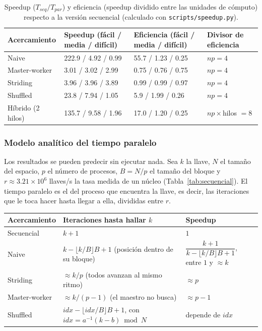 \documentclass[11pt,letterpaper]{article}
\begin{document}
\begin{table}[H]
\centering
\small
\begin{tabular}{p{2.6cm}p{3.6cm}p{3.6cm}p{3.5cm}}
\toprule
\textbf{Acercamiento} & \textbf{Speedup (fácil / media / difícil)} & \textbf{Eficiencia (fácil / media / difícil)} & \textbf{Divisor de eficiencia} \\
\midrule
Naive           & 222.9 / 4.92 / 0.99 & 55.7 / 1.23 / 0.25 & $np=4$ \\
Master-worker   & 3.01 / 3.02 / 2.99  & 0.75 / 0.76 / 0.75 & $np=4$ \\
Striding        & 3.96 / 3.96 / 3.89  & 0.99 / 0.99 / 0.97 & $np=4$ \\
Shuffled        & 23.8 / 7.94 / 1.05  & 5.9 / 1.99 / 0.26  & $np=4$ \\
Híbrido (2 hilos) & 135.7 / 9.58 / 1.96 & 17.0 / 1.20 / 0.25 & $np\times$hilos $=8$ \\
\bottomrule
\end{tabular}
\caption{Speedup ($T_{seq}/T_{par}$) y eficiencia (speedup dividido
entre las unidades de cómputo) respecto a la versión secuencial
(calculado con \texttt{scripts/speedup.py}).}
\label{tab:speedup}
\end{table}

\subsubsection*{Modelo analítico del tiempo paralelo}
\label{sec:modelo}

Los resultados se pueden predecir sin ejecutar nada. Sea $k$ la llave,
$N$ el tamaño del espacio, $p$ el número de procesos, $B=N/p$ el tamaño
del bloque y $r\approx3.21\times10^{6}$ llaves/s la tasa medida de un
núcleo (Tabla~\ref{tab:secuencial}). El tiempo paralelo es el del
proceso que encuentra la llave, es decir, las iteraciones que le toca
hacer hasta llegar a ella, divididas entre $r$.

\begin{center}
\small
\begin{tabular}{lll}
\toprule
\textbf{Acercamiento} & \textbf{Iteraciones hasta hallar $k$} & \textbf{Speedup} \\
\midrule
Secuencial & $k+1$ & $1$ \\
Naive & $k-\lfloor k/B\rfloor B+1$ (posición dentro de su bloque) & $\dfrac{k+1}{k-\lfloor k/B\rfloor B+1}$, entre $1$ y $\approx k$ \\
Striding & $\approx k/p$ (todos avanzan al mismo ritmo) & $\approx p$ \\
Master-worker & $\approx k/(p-1)$ (el maestro no busca) & $\approx p-1$ \\
Shuffled & $idx-\lfloor idx/B\rfloor B+1$, con $idx=a^{-1}(k-b)\bmod N$ & depende de $idx$ \\
\bottomrule
\end{tabular}
\end{center}
\end{document}
